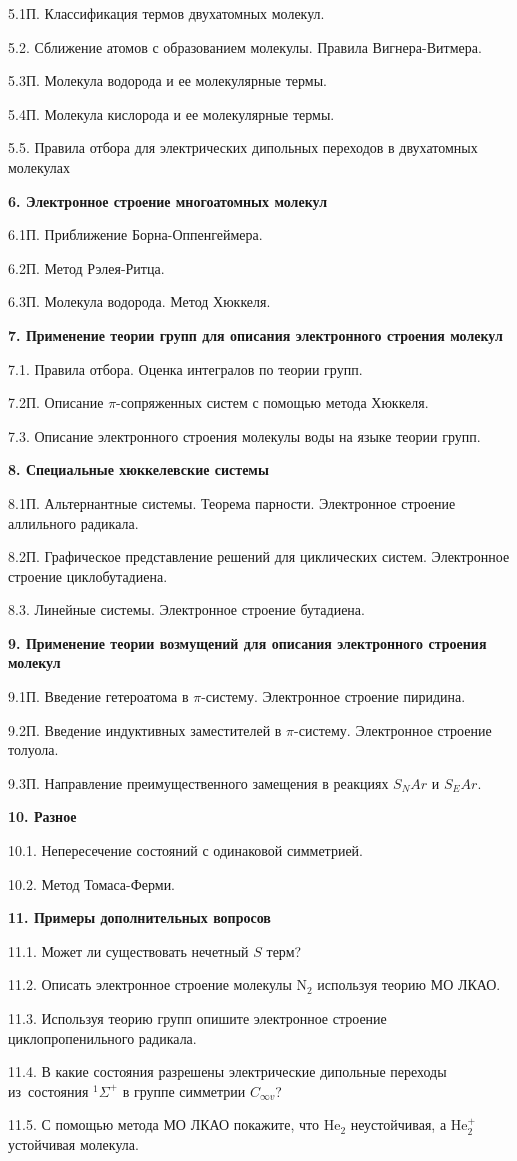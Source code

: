 5.1П. Классификация термов двухатомных молекул.\par
5.2. Сближение атомов с образованием молекулы. Правила Вигнера-Витмера.\par
5.3П. Молекула водорода и ее молекулярные термы.\par
5.4П. Молекула кислорода и ее молекулярные термы.\par
5.5. Правила отбора для электрических дипольных переходов в двухатомных молекулах\par
\textbf{6. Электронное строение многоатомных молекул}\par
6.1П. Приближение Борна-Оппенгеймера.\par
6.2П. Метод Рэлея-Ритца.\par
6.3П. Молекула водорода. Метод Хюккеля.\par
\textbf{7. Применение теории групп для описания электронного строения молекул}\par
7.1. Правила отбора. Оценка интегралов по теории групп.\par
7.2П. Описание $\pi$-сопряженных систем с помощью метода Хюккеля.\par
7.3. Описание электронного строения молекулы воды на языке теории групп.\par
\textbf{8. Специальные хюккелевские системы}\par
8.1П. Альтернантные системы. Теорема парности. Электронное строение аллильного радикала.\par
8.2П. Графическое представление решений для циклических систем. Электронное строение циклобутадиена.\par
8.3. Линейные системы. Электронное строение бутадиена.\par
\textbf{9. Применение теории возмущений для описания электронного строения молекул}\par
9.1П. Введение гетероатома в $\pi$-систему. Электронное строение пиридина.\par
9.2П. Введение индуктивных заместителей в $\pi$-систему. Электронное строение толуола.\par
9.3П. Направление преимущественного замещения в реакциях $S_NAr$ и $S_EAr$.\par
\textbf{10. Разное}\par
10.1. Непересечение состояний с одинаковой симметрией.\par
10.2. Метод Томаса-Ферми.\par
\textbf{11. Примеры дополнительных вопросов}\par
11.1. Может ли существовать нечетный $S$ терм?\par
11.2. Описать электронное строение молекулы N$_2$ используя теорию МО ЛКАО.\par
11.3. Используя теорию групп опишите электронное строение циклопропенильного радикала.\par
11.4. В какие состояния разрешены электрические дипольные переходы из~состояния $^1\Sigma^+$ в группе симметрии $C_{\infty v}$?\par
11.5. С помощью метода МО ЛКАО покажите, что $\text{He}_2$ неустойчивая, а $\text{He}_2^+$ устойчивая молекула.\par
\newpage

